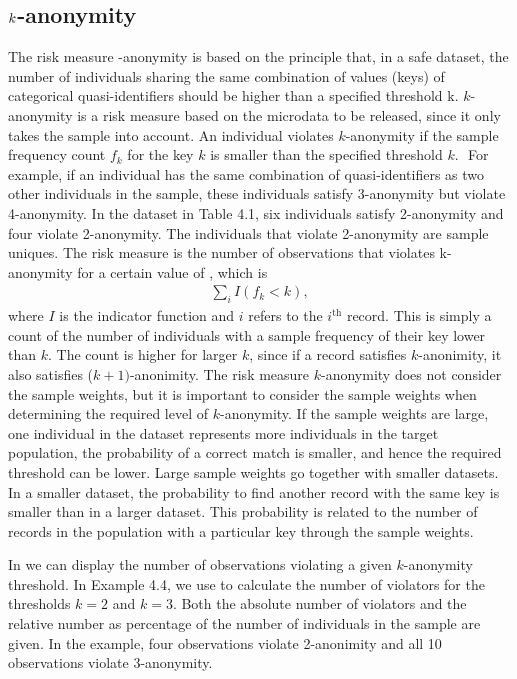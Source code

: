 \documentclass[letterpaper,10pt,english]{sphinxmanual}
\begin{document}
\subsection{\protect\(k\protect\)-anonymity}
\label{\detokenize{measure_risk:anonymity}}
The risk measure -anonymity is based on the principle that, in a safe
dataset, the number of individuals sharing the same combination of
values (keys) of categorical quasi-identifiers should be higher than a
specified threshold\(\text{\ k}\). \(k\)-anonymity is a risk
measure based on the microdata to be released, since it only takes the
sample into account. An individual violates \(k\)-anonymity if the
sample frequency count \(f_{k}\) for the key \(k\) is smaller
than the specified threshold \(k\text{.\ \ }\) For example, if an
individual has the same combination of quasi-identifiers as two other
individuals in the sample, these individuals satisfy 3-anonymity but
violate 4-anonymity. In the dataset in Table 4.1, six individuals
satisfy 2-anonymity and four violate 2-anonymity. The individuals that
violate 2-anonymity are sample uniques. The risk measure is the number
of observations that violates k-anonymity for a certain value of ,
which is
\begin{equation*}
\begin{split}\sum_{i}^{}{I(f_{k} < k)},\end{split}
\end{equation*}
where \(I\) is the indicator function and \(i\) refers to the
\(i\)$^{\text{th}}$ record. This is simply a count of the number of
individuals with a sample frequency of their key lower than \(k\).
The count is higher for larger \(k\), since if a record satisfies
\(k\)-anonimity, it also satisfies (\(k + 1)\)-anonimity. The
risk measure \(k\)-anonymity does not consider the sample weights,
but it is important to consider the sample weights when determining the
required level of \(k\)-anonymity. If the sample weights are large,
one individual in the dataset represents more individuals in the target
population, the probability of a correct match is smaller, and hence the
required threshold can be lower. Large sample weights go together with
smaller datasets. In a smaller dataset, the probability to find another
record with the same key is smaller than in a larger dataset. This
probability is related to the number of records in the population with a
particular key through the sample weights.

In  we can display the number of observations violating a
given \(k\)-anonymity threshold. In Example 4.4, we use 
to calculate the number of violators for the thresholds \(k = 2\)
and \(k = 3\). Both the absolute number of violators and the
relative number as percentage of the number of individuals in the sample
are given. In the example, four observations violate 2-anonimity and all
10 observations violate 3-anonymity.
\end{document}
